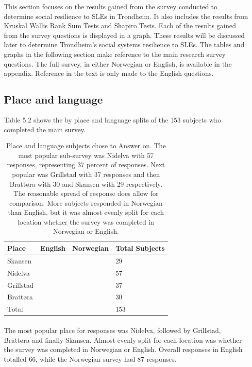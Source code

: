 This section focuses on the results gained from the survey conducted to determine social resilience to SLEs in Trondheim.  It also includes the results from Kruskal Wallis Rank Sum Tests and Shapiro Tests. Each of the results gained from the survey questions is displayed in a graph. These results will be discussed later to determine Trondheim's social systems resilience to SLEs. The tables and graphs in the following section make reference to the main research survey questions. The full survey, in either Norwegian or English, is available in the appendix. Reference in the text is only made to the English questions. 



\subsection{Place and language}
Table 5.2 shows the by place and language splits of the 153 subjects who completed the main survey. 
\begin{table}[H]
    \centering
    \begin{tabular}{|l|l|l|l|}
    \hline
    \textbf{Place}  & \textbf{ English} & \textbf{Norwegian} & \textbf{Total Subjects}  \\ \hline
      Skansen & &  & 29    \\ \hline
      Nidelva & & & 57      \\ \hline
      Grillstad & & & 37       \\ \hline
      Brattøra & & & 30     \\ \hline
      Total & & & 153   \\ \hline
     \end{tabular}
    \caption{Place and language subjects chose to Answer on. The most popular sub-survey was Nidelva with 57 responses, representing 37 percent of responses. Next popular was Grillstad with 37 responses and then Brattøra with 30 and Skansen with 29 respectively. The reasonable spread of response does allow for comparison. More subjects responded in Norwegian than English, but it was almost evenly split for each location whether the survey was completed in Norwegian or English.}
    \label{tab:place}
\end{table}
\paragraph{}

The most popular place for responses was Nidelva, followed by Grillstad, Brattøra and finally Skansen. Almost evenly split for each location was whether the survey was completed in Norwegian or English. Overall responses in English totalled 66, while the Norwegian survey had 87 responses.  

